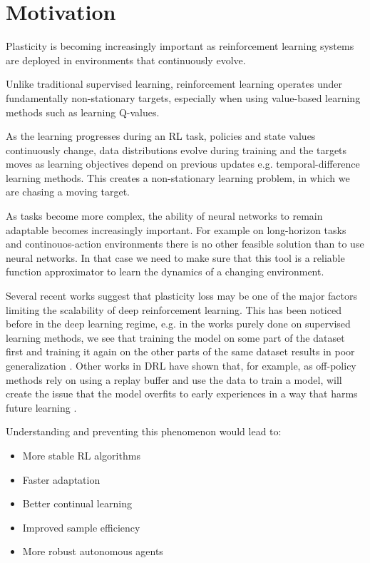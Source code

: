 \section{Motivation}\label{sec:motivation}
Plasticity is becoming increasingly important as reinforcement learning systems are deployed in environments that continuously evolve.

Unlike traditional supervised learning, reinforcement learning operates under fundamentally non-stationary targets, especially when using value-based learning methods such as learning Q-values.

As the learning progresses during an RL task, policies and state values continuously change, data distributions evolve during training and the targets moves as learning objectives depend on previous updates e.g. temporal-difference learning methods. This creates a non-stationary learning problem, in which we are chasing a moving target.

As tasks become more complex, the ability of neural networks to remain adaptable becomes increasingly important. For example on long-horizon tasks and continouos-action environments there is no other feasible solution than to use neural networks. In that case we need to make sure that this tool is a reliable function approximator to learn the dynamics of a changing environment.

Several recent works suggest that plasticity loss may be one of the major factors limiting the scalability of deep reinforcement learning. This has been noticed before in the deep learning regime, e.g. in the works purely done on supervised learning methods, we see that training the model on some part of the dataset first and training it again on the other parts of the same dataset results in poor generalization \citep{ash2020warm}. Other works in DRL have shown that, for example, as off-policy methods rely on using a replay buffer and use the data to train a model, will create the issue that the model overfits to early experiences in a way that harms future learning \citep{nikishin2022primacy}.

Understanding and preventing this phenomenon would lead to:

\begin{itemize}[noitemsep]
    \item More stable RL algorithms
    \item Faster adaptation
    \item Better continual learning
    \item Improved sample efficiency
    \item More robust autonomous agents
\end{itemize}